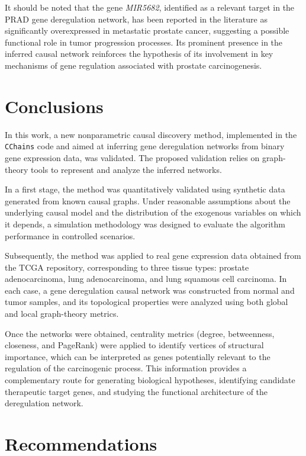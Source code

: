 \documentclass[12pt,a4paper]{report}
\begin{document}
It should be noted that the gene \textit{MIR5682}, identified as a relevant target in the PRAD gene deregulation network, has been reported in the literature as significantly overexpressed in metastatic prostate cancer, suggesting a possible functional role in tumor progression processes\cite{metastasis}. Its prominent presence in the inferred causal network reinforces the hypothesis of its involvement in key mechanisms of gene regulation associated with prostate carcinogenesis.

\newpage

\chapter*{Conclusions}

In this work, a new nonparametric causal discovery method, implemented in the \texttt{CChains} code and aimed at inferring gene deregulation networks from binary gene expression data, was validated. The proposed validation relies on graph-theory tools to represent and analyze the inferred networks.

In a first stage, the method was quantitatively validated using synthetic data generated from known causal graphs. Under reasonable assumptions about the underlying causal model and the distribution of the exogenous variables on which it depends, a simulation methodology was designed to evaluate the algorithm performance in controlled scenarios.

Subsequently, the method was applied to real gene expression data obtained from the TCGA repository, corresponding to three tissue types: prostate adenocarcinoma, lung adenocarcinoma, and lung squamous cell carcinoma. In each case, a gene deregulation causal network was constructed from normal and tumor samples, and its topological properties were analyzed using both global and local graph-theory metrics.

Once the networks were obtained, centrality metrics (degree, betweenness, closeness, and PageRank) were applied to identify vertices of structural importance, which can be interpreted as genes potentially relevant to the regulation of the carcinogenic process. This information provides a complementary route for generating biological hypotheses, identifying candidate therapeutic target genes, and studying the functional architecture of the deregulation network.

\chapter*{Recommendations}
\end{document}
